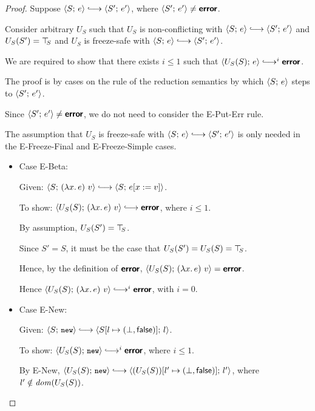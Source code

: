 \begin{proof}
  Suppose $\config{S}{e} \parstepsto \config{S'}{e'}$, where
  $\langle S';\, e' \rangle \neq \textbf{\textsf{error}}$.

  Consider arbitrary $U_S$ such that $U_S$ is non-conflicting with
  $\config{S}{e} \parstepsto \config{S'}{e'}$ and $U_S(S') = \top\hspace{-0.85mm}_{S}$
  and $U_S$ is freeze-safe with $\config{S}{e} \parstepsto
  \config{S'}{e'}$.

  We are required to show that there exists $i \leq 1$ such that
  $\config{U_S(S)}{e} \parstepsto^i \error$.

  The proof is by cases on the rule of the reduction semantics by
  which $\langle S;\, e \rangle$ steps to $\langle S';\, e' \rangle$.

  Since $\langle S';\, e' \rangle \neq \textbf{\textsf{error}}$, we do not need to consider the
  {\sc E-Put-Err} rule.

  The assumption that $U_S$ is freeze-safe with $\config{S}{e}
  \parstepsto \config{S'}{e'}$ is only needed in the {\sc
    E-Freeze-Final} and {\sc E-Freeze-Simple} cases.

  \begin{itemize}

  \item Case {\sc E-Beta}:

    Given: $\config{S}{\app{(\lam{x}{e})}{v}} \parstepsto
    \config{S}{\subst{e}{x}{v}}$.

    To show: $\config{U_S(S)}{\app{(\lam{x}{e})}{v}} \parstepsto
    \error$, where $i \leq 1$.

    By assumption, $U_S(S') = \top\hspace{-0.85mm}_{S}$.

    Since $S' = S$, it must be the case that $U_S(S') = U_S(S) =
    \top\hspace{-0.85mm}_{S}$.

    Hence, by the definition of $\textbf{\textsf{error}}$,
    $\langle U_S(S);\, (\lambda x.\,e)~v \rangle = \textbf{\textsf{error}}$.

    Hence $\config{U_S(S)}{\app{(\lam{x}{e})}{v}} \parstepsto^i
    \error$, with $i = 0$.

  \item Case {\sc E-New}:

    Given: $\config{S}{\NEW} \parstepsto
    \config{\extS{S}{l}{\bot}{\frozenfalse}}{l}$.

    To show: $\config{U_S(S)}{\NEW} \parstepsto^i \error$, where $i
    \leq 1$.

    By {\sc E-New}, $\config{U_S(S)}{\NEW} \parstepsto
    \config{\extS{(U_S(S))}{l'}{\bot}{\frozenfalse}}{l'}$, where $l'
    \notin \mathit{dom}(U_S(S))$.


\end{itemize}
\end{proof}
